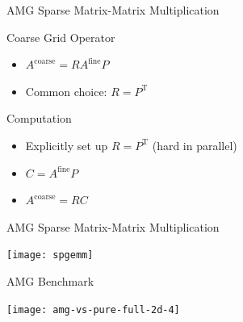 
\begin{frame}{AMG Sparse Matrix-Matrix Multiplication}
 \begin{block}{Coarse Grid Operator}
  \begin{itemize}
   \item $A^{\mathrm{coarse}} = R A^{\mathrm{fine}} P$
   \item Common choice: $R = P^{\mathrm{T}}$
  \end{itemize}
 \end{block}

 \begin{block}{Computation}
  \begin{itemize}
   \item Explicitly set up $R = P^{\mathrm{T}}$ (hard in parallel)
   \item $C = A^{\mathrm{fine}} P$
   \item $A^{\mathrm{coarse}} = R C$
  \end{itemize}
 \end{block}

\end{frame}


\begin{frame}{AMG Sparse Matrix-Matrix Multiplication}
  \begin{center}
    \texttt{[image: spgemm]}
  \end{center}
\end{frame}




\begin{frame}{AMG Benchmark}
  \begin{center}
    \texttt{[image: amg-vs-pure-full-2d-4]}
  \end{center}
\end{frame}
